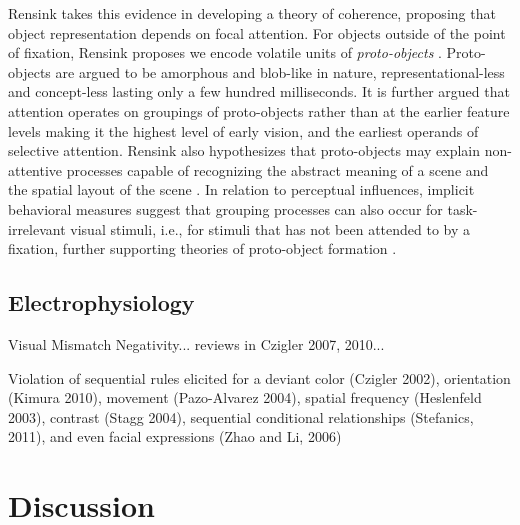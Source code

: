 Rensink takes this evidence in developing a theory of coherence, proposing that object representation depends on focal attention.  For objects outside of the point of fixation, Rensink proposes we encode volatile units of \textit{proto-objects} \cite{Rensink2000,Rensink2001}.  Proto-objects are argued to be amorphous and blob-like in nature, representational-less and concept-less lasting only a few hundred milliseconds.  It is further argued that attention operates on groupings of proto-objects rather than at the earlier feature levels making it the highest level of early vision, and the earliest operands of selective attention.  Rensink also hypothesizes that proto-objects may explain non-attentive processes capable of recognizing the abstract meaning of a scene and the spatial layout of the scene \cite{Rensink2002}.  In relation to perceptual influences, implicit behavioral measures suggest that grouping processes can also occur for task-irrelevant visual stimuli, i.e., for stimuli that has not been attended to by a fixation, further supporting theories of proto-object formation \cite{Lamy2006}.

\subsection{Electrophysiology}\label{sec:electrophysiology}

Visual Mismatch Negativity... reviews in Czigler 2007, 2010...
\cite{Stefanics2011}

Violation of sequential rules elicited for a deviant color (Czigler 2002), orientation (Kimura 2010), movement (Pazo-Alvarez 2004), spatial frequency (Heslenfeld 2003), contrast (Stagg 2004), sequential conditional relationships (Stefanics, 2011), and even facial expressions (Zhao and Li, 2006)



\section{Discussion}

